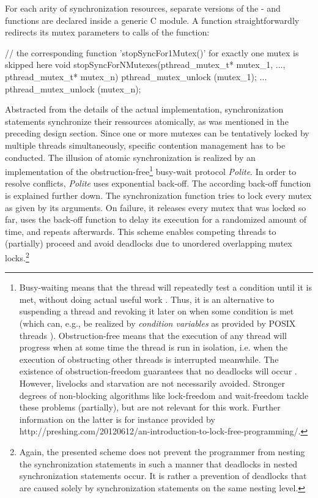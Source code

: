 For each arity of synchronization resources, separate versions of the - and  functions are declared inside a generic C module. A  function straightforwardly redirects its mutex parameters to calls of the  function:
\begin{ccode}
// the corresponding function 'stopSyncFor1Mutex()' for exactly one mutex is skipped here
void stopSyncForNMutexes(pthread_mutex_t* mutex_1, ..., pthread_mutex_t* mutex_n) { 
  pthread_mutex_unlock (mutex_1);
  ...
  pthread_mutex_unlock (mutex_n); 
}
\end{ccode}

Abstracted from the details of the actual implementation, synchronization statements synchronize their ressources atomically, as was mentioned in the preceding design section. Since one or more mutexes can be tentatively locked by multiple threads simultaneously, specific contention management has to be conducted. The illusion of atomic synchronization is realized by an implementation of the obstruction-free\footnote{Busy-waiting means that the thread will repeatedly test a condition until it is met, without doing actual useful work \cite[p.~166]{AnIntroductionToParallelProgramming}. Thus, it is an alternative to suspending a thread and revoking it later on when some condition is met (which can, e.g., be realized by \textit{condition variables} as provided by POSIX threads \cite[p.~77]{ProgrammingWithPOSIXThreads}). Obstruction-free means that the execution of any thread will progress when at some time the thread is run in isolation, i.e. when the execution of obstructing other threads is interrupted meanwhile. The existence of obstruction-freedom guarantees that no deadlocks will occur \cite{ObstructionFreeAuthorizationEnforcement}. However, livelocks and starvation are not necessarily avoided. Stronger degrees of non-blocking algorithms like lock-freedom and wait-freedom tackle these problems (partially), but are not relevant for this work. Further information on the latter is for instance provided by http://preshing.com/20120612/an-introduction-to-lock-free-programming/. %
} busy-wait protocol \textit{Polite}. In order to resolve conflicts, \textit{Polite} uses exponential back-off. The according back-off function is explained further down. The synchronization function tries to lock every mutex as given by its arguments. On failure, it releases every mutex that was locked so far, uses the back-off function to delay its execution for a randomized amount of time, and repeats afterwards. This scheme enables competing threads to (partially) proceed and avoid deadlocks due to unordered overlapping mutex locks.\footnote{Again, the presented scheme does not prevent the programmer from nesting the synchronization statements in such a manner that deadlocks in nested synchronization statements occur. It is rather a prevention of deadlocks that are caused solely by synchronization statements on the same nesting level.}
